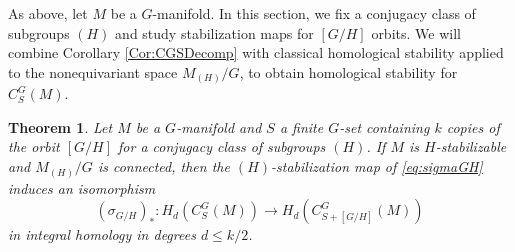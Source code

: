 \documentclass[11pt]{amsart}
\newtheorem{theorem}[equation]{Theorem}
\theoremstyle{definition}
\numberwithin{equation}{subsection} %
\begin{document}
As above, let $M$ be a $G$-manifold. In this section, we fix a conjugacy class of subgroups $(H)$ and study stabilization maps for $[G/H]$ orbits. We will combine Corollary \ref{Cor:CGSDecomp} with classical homological stability applied to the nonequivariant space $M_{(H)}/G$, to obtain homological stability for $C_S^G(M)$. 


\begin{theorem}\label{Thm:CGSHomStab}
Let $M$ be a $G$-manifold and $S$ a finite $G$-set containing $k$
copies of the orbit
$[G/H]$ for a conjugacy class of subgroups $(H)$. If $M$ is $H$-stabilizable and
$M_{(H)}/G$ is connected,
then the $(H)$-stabilization map of \eqref{eq:sigmaGH} induces an isomorphism
$$ (\sigma_{G/H})_*: H_d(C^G_S(M)) \to H_d(C^G_{S+[G/H]}(M)) $$
in integral homology in degrees $d\leq k/2$.
\end{theorem}
\end{document}
